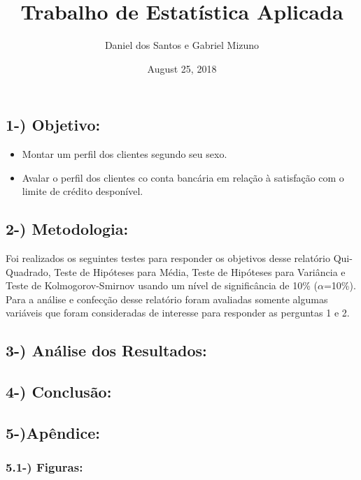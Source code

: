 \documentclass[]{article}
\title{Trabalho de Estatística Aplicada}
\author{Daniel dos Santos e Gabriel Mizuno}
\date{August 25, 2018}
\providecommand{\tightlist}{%
  \setlength{\itemsep}{0pt}\setlength{\parskip}{0pt}}
\begin{document}
\maketitle

{
\setcounter{tocdepth}{1}
\tableofcontents
}
\subsection{1-) Objetivo:}\label{objetivo}

\begin{itemize}
\tightlist
\item
  Montar um perfil dos clientes segundo seu sexo.\\
\item
  Avalar o perfil dos clientes co conta bancária em relação à satisfação
  com o limite de crédito desponível.
\end{itemize}

\subsection{2-) Metodologia:}\label{metodologia}

Foi realizados os seguintes testes para responder os objetivos desse
relatório Qui-Quadrado, Teste de Hipóteses para Média, Teste de
Hipóteses para Variância e Teste de Kolmogorov-Smirnov usando um nível
de significância de 10\% (\(\alpha\)=10\%). Para a análise e confecção
desse relatório foram avaliadas somente algumas variáveis que foram
consideradas de interesse para responder as perguntas 1 e 2.

\subsection{3-) Análise dos Resultados:}\label{analise-dos-resultados}

\subsection{4-) Conclusão:}\label{conclusao}

\subsection{5-)Apêndice:}\label{apendice}

\subsubsection{5.1-) Figuras:}\label{figuras}
\end{document}

